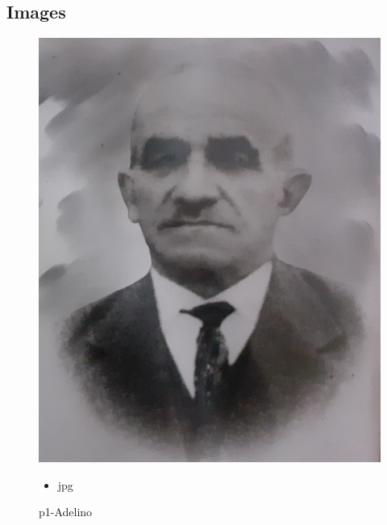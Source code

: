 \documentclass{article}
\begin{document}
\clearpage



\begin{center}
\section{Images}
\end{center}


	

		\begin{figure}[ht!]
		\begin{minipage}{0.35\textwidth}
			\centering
			\includegraphics[width=\linewidth]{p1-Adelino.jpg}
			\caption{ p1-Adelino }
		\end{minipage}
		\hspace{1cm} %
		\begin{minipage}{0.3\textwidth}
			\begin{tcolorbox}[colback=white, colframe=black, boxrule=1pt]
				\begin{itemize}
					\item jpg
                    
				\end{itemize}

			\end{tcolorbox}
		\end{minipage}
	\end{figure}
	
\end{document}
